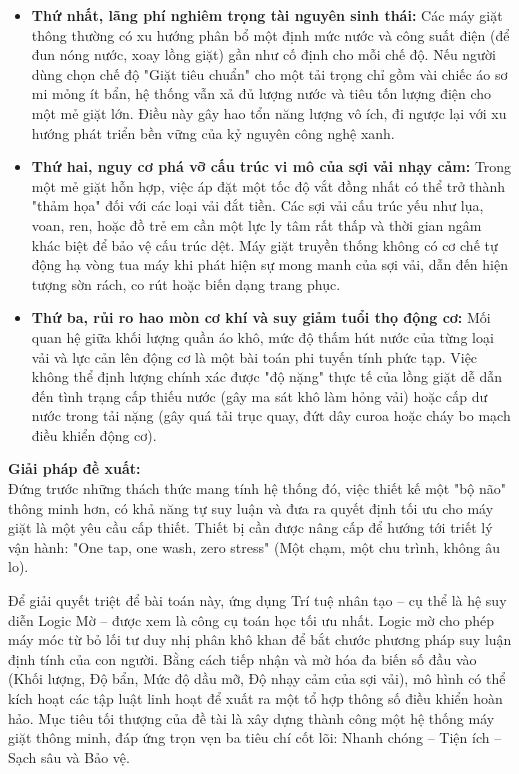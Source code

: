 \documentclass[12pt, a4paper]{article}
\begin{document}
\begin{itemize}
    \item \textbf{Thứ nhất, lãng phí nghiêm trọng tài nguyên sinh thái:} Các máy giặt thông thường có xu hướng phân bổ một định mức nước và công suất điện (để đun nóng nước, xoay lồng giặt) gần như cố định cho mỗi chế độ. Nếu người dùng chọn chế độ "Giặt tiêu chuẩn" cho một tải trọng chỉ gồm vài chiếc áo sơ mi mỏng ít bẩn, hệ thống vẫn xả đủ lượng nước và tiêu tốn lượng điện cho một mẻ giặt lớn. Điều này gây hao tổn năng lượng vô ích, đi ngược lại với xu hướng phát triển bền vững của kỷ nguyên công nghệ xanh.
    \item \textbf{Thứ hai, nguy cơ phá vỡ cấu trúc vi mô của sợi vải nhạy cảm:} Trong một mẻ giặt hỗn hợp, việc áp đặt một tốc độ vắt đồng nhất có thể trở thành "thảm họa" đối với các loại vải đắt tiền. Các sợi vải cấu trúc yếu như lụa, voan, ren, hoặc đồ trẻ em cần một lực ly tâm rất thấp và thời gian ngâm khác biệt để bảo vệ cấu trúc dệt. Máy giặt truyền thống không có cơ chế tự động hạ vòng tua máy khi phát hiện sự mong manh của sợi vải, dẫn đến hiện tượng sờn rách, co rút hoặc biến dạng trang phục.
    \item \textbf{Thứ ba, rủi ro hao mòn cơ khí và suy giảm tuổi thọ động cơ:} Mối quan hệ giữa khối lượng quần áo khô, mức độ thấm hút nước của từng loại vải và lực cản lên động cơ là một bài toán phi tuyến tính phức tạp. Việc không thể định lượng chính xác được "độ nặng" thực tế của lồng giặt dễ dẫn đến tình trạng cấp thiếu nước (gây ma sát khô làm hỏng vải) hoặc cấp dư nước trong tải nặng (gây quá tải trục quay, đứt dây curoa hoặc cháy bo mạch điều khiển động cơ).
\end{itemize}

\textbf{Giải pháp đề xuất:}\\
Đứng trước những thách thức mang tính hệ thống đó, việc thiết kế một "bộ não" thông minh hơn, có khả năng tự suy luận và đưa ra quyết định tối ưu cho máy giặt là một yêu cầu cấp thiết. Thiết bị cần được nâng cấp để hướng tới triết lý vận hành: "One tap, one wash, zero stress" (Một chạm, một chu trình, không âu lo).

Để giải quyết triệt để bài toán này, ứng dụng Trí tuệ nhân tạo – cụ thể là hệ suy diễn Logic Mờ – được xem là công cụ toán học tối ưu nhất. Logic mờ cho phép máy móc từ bỏ lối tư duy nhị phân khô khan để bắt chước phương pháp suy luận định tính của con người. Bằng cách tiếp nhận và mờ hóa đa biến số đầu vào (Khối lượng, Độ bẩn, Mức độ dầu mỡ, Độ nhạy cảm của sợi vải), mô hình có thể kích hoạt các tập luật linh hoạt để xuất ra một tổ hợp thông số điều khiển hoàn hảo. Mục tiêu tối thượng của đề tài là xây dựng thành công một hệ thống máy giặt thông minh, đáp ứng trọn vẹn ba tiêu chí cốt lõi: Nhanh chóng – Tiện ích – Sạch sâu và Bảo vệ.
\end{document}
